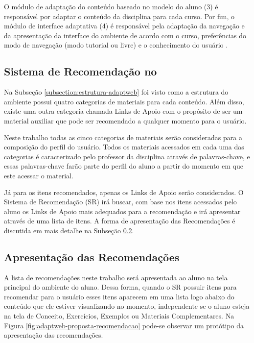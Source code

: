 O módulo de adaptação do conteúdo baseado no modelo do aluno (3) é responsável por adaptar o conteúdo da disciplina
para cada curso. Por fim, o módulo de interface adaptativa (4) é responsável pela adaptação da navegação e da
apresentação da interface do ambiente de acordo com o curso, preferências do modo de navegação (modo tutorial ou livre)
e o conhecimento do usuário \cite{gasparini2003interface}.

\subsection{Sistema de Recomendação no \adaptweb}

Na Subseção \ref{subsection:estrutura-adaptweb} foi visto como a estrutura do ambiente \adaptweb possui quatro categorias
de materiais para cada conteúdo. Além disso, existe uma outra categoria chamada Links de Apoio com o propósito de ser um
material auxiliar que pode ser recomendado a qualquer momento para o usuário.

Neste trabalho todas as cinco categorias de materiais serão consideradas para a composição do perfil do usuário. Todos os
materiais acessados em cada uma das categorias é caracterizado pelo professor da disciplina através de palavras-chave, e
essas palavras-chave farão parte do perfil do aluno a partir do momento em que este acessar o material.

Já para os itens recomendados, apenas os Links de Apoio serão considerados. O Sistema de Recomendação (SR) irá buscar, com
base nos itens acessados pelo aluno os Links de Apoio mais adequados para a recomendação e irá apresentar através de uma
lista de itens. A forma de apresentação das Recomendações é discutida em mais detalhe na Subseção \ref{subsection:apresentacao-recomendacoes}.

\subsection{Apresentação das Recomendações}\label{subsection:apresentacao-recomendacoes}

A lista de recomendações neste trabalho será apresentada ao aluno na tela principal do ambiente do aluno. Dessa forma,
quando o SR possuir itens para recomendar para o usuário esses itens aparecem em uma lista logo abaixo do conteúdo que
ele estiver visualizando no momento, independente se o aluno esteja na tela de Conceito, Exercícios, Exemplos ou
Materiais Complementares. Na Figura \ref{fig:adaptweb-proposta-recomendacao} pode-se observar um protótipo da
apresentação das recomendações.

